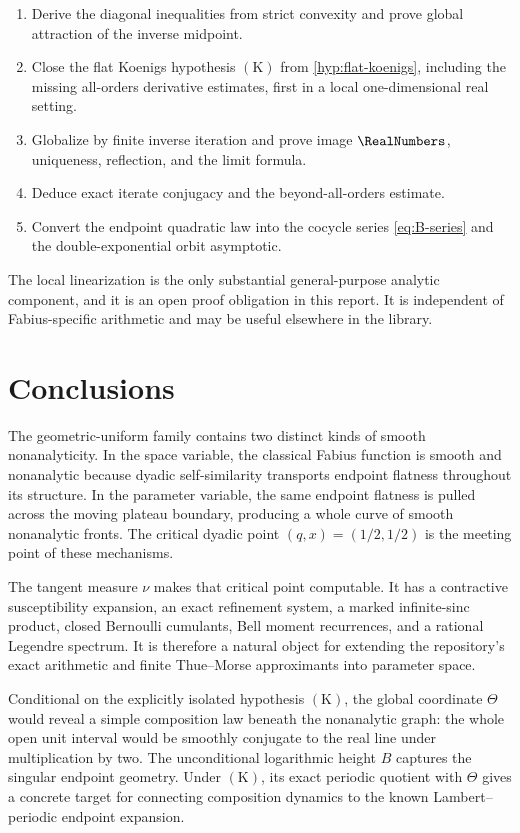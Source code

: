 \documentclass[11pt,oneside]{article}
\theoremstyle{definition}
\theoremstyle{remark}
\begin{document}
\begin{enumerate}
\item Derive the diagonal inequalities from strict convexity and prove global attraction of the
inverse midpoint.
\item Close the flat Koenigs hypothesis \(\mathrm{(K)}\) from
\cref{hyp:flat-koenigs}, including the missing all-orders derivative estimates, first in a
local one-dimensional real setting.
\item Globalize by finite inverse iteration and prove image \(\RealNumbers\), uniqueness, reflection, and
the limit formula.
\item Deduce exact iterate conjugacy and the beyond-all-orders estimate.
\item Convert the endpoint quadratic law into the cocycle series \eqref{eq:B-series} and the
double-exponential orbit asymptotic.
\end{enumerate}

The local linearization is the only substantial general-purpose analytic component, and it is
an open proof obligation in this report.  It is independent of Fabius-specific arithmetic and
may be useful elsewhere in the library.

\section{Conclusions}
\label{sec:conclusion}

The geometric-uniform family contains two distinct kinds of smooth nonanalyticity.  In the
space variable, the classical Fabius function is smooth and nonanalytic because dyadic
self-similarity transports endpoint flatness throughout its structure.  In the parameter
variable, the same endpoint flatness is pulled across the moving plateau boundary, producing a
whole curve of smooth nonanalytic fronts.  The critical dyadic point \((q,x)=(1/2,1/2)\) is the
meeting point of these mechanisms.

The tangent measure \(\nu\) makes that critical point computable.  It has a contractive
susceptibility expansion, an exact refinement system, a marked infinite-sinc product, closed
Bernoulli cumulants, Bell moment recurrences, and a rational Legendre spectrum.  It is therefore
a natural object for extending the repository's exact arithmetic and finite Thue--Morse
approximants into parameter space.

Conditional on the explicitly isolated hypothesis \(\mathrm{(K)}\), the global coordinate
\(\Theta\) would reveal a simple composition law beneath the nonanalytic graph: the whole open
unit interval would be smoothly conjugate to the real line under multiplication by two.  The
unconditional logarithmic height \(B\) captures the singular endpoint geometry.  Under
\(\mathrm{(K)}\), its exact periodic quotient with \(\Theta\) gives a concrete target for
connecting composition dynamics to the known Lambert--periodic endpoint expansion.
\end{document}
